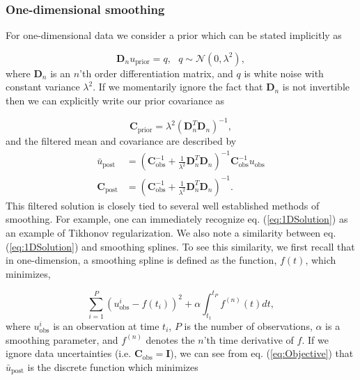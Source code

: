 \documentclass[10pt,a4paper]{article}
\begin{document}
\subsubsection{One-dimensional smoothing}
For one-dimensional data we consider a prior which can be stated implicitly as

\begin{equation}\label{eq:ImplicitPrior1D}
  \mathbf{D}_{n} u_\mathrm{prior} = q, \ \ \ q \sim \mathcal{N}(0,\lambda^2),
\end{equation}  
where $\mathbf{D}_n$ is an $n$'th order differentiation matrix, and $q$ is white noise with constant variance $\lambda^2$.  If we momentarily ignore the fact that $\mathbf{D}_n$ is not invertible then we can explicitly write our prior covariance as

\begin{equation}\label{eq:ExplicitPrior1D}
\mathbf{C_\mathrm{prior}} = \lambda^2(\mathbf{D}_n^T\mathbf{D}_n)^{-1},
\end{equation}
and the filtered mean and covariance are described by
\begin{equation}\label{eq:1DSolution}
\begin{split}
\bar{u}_\mathrm{post} &= (\mathbf{C}_\mathrm{obs}^{-1} +   
                   \frac{1}{\lambda^2}\mathbf{D}_n^T\mathbf{D}_n)^{-1}\mathbf{C}_\mathrm{obs}^{-1}
                   u_\mathrm{obs}
\\
\mathbf{C}_\mathrm{post} &= (\mathbf{C}_\mathrm{obs}^{-1} +   
                            \frac{1}{\lambda^2}\mathbf{D}_n^T\mathbf{D}_n)^{-1}.
\end{split}
\end{equation}
This filtered solution is closely tied to several well established methods of smoothing.  For example, one can immediately recognize eq. (\ref{eq:1DSolution}) as an example of Tikhonov regularization. We also note a similarity between eq. (\ref{eq:1DSolution}) and smoothing splines.  To see this similarity, we first recall that in one-dimension, a smoothing spline is defined as the function, $f(t)$, which minimizes,

\begin{equation}\label{eq:SmoothingSpline}
\sum_{i=1}^P (u_\mathrm{obs}^i - f(t_i))^2 + \alpha \int_{t_1}^{t_P} f^{(n)}(t) dt,
\end{equation}
where $u_\mathrm{obs}^i$ is an observation at time $t_i$, $P$ is the number of observations, $\alpha$ is a smoothing parameter, and $f^{(n)}$ denotes the $n$'th time derivative of $f$.
If we ignore data uncertainties (i.e. $\mathbf{C}_\mathrm{obs}=\mathbf{I}$), we can see from eq. (\ref{eq:Objective}) that $\bar{u}_\mathrm{post}$ is the discrete function which minimizes  
\end{document}
